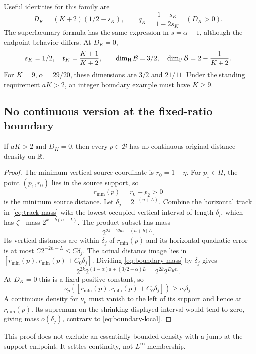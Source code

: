 Useful identities for this family are
\begin{equation}\label{eq:dimension-identities}
 D_K=(K+2)(1/2-s_K),\qquad
 q_K=\frac{1-s_K}{1-2s_K}\quad(D_K>0).
\end{equation}
The superlacunary formula has the same expression in $s=\alpha-1$,
although the endpoint behavior differs.
At $D_K=0$,
\begin{equation}\label{eq:boundary-dimensions}
 s_K=1/2,\quad t_K=\frac{K+1}{K+2},\qquad
 \dim_{\mathrm H}\mathcal B=3/2,\quad\dim_{\mathrm P}\mathcal B=2-\frac1{K+2}.
\end{equation}
For $K=9$, $\alpha=29/20$, these dimensions are $3/2$ and $21/11$.
Under the standing requirement $aK>2$, an integer boundary example must
have $K\geq9$.

\subsection{No continuous version at the fixed-ratio boundary}
\begin{proposition}\label{prop:boundary-discontinuity}
If $aK>2$ and $D_K=0$, then every $p\in\mathcal B$ has no continuous
original distance density on $\mathbb R$.
\end{proposition}
\begin{proof}
The minimum vertical source coordinate is $r_0=1-\eta$. For
$p_1\in H$, the point $(p_1,r_0)$ lies in the source support, so
\[
 r_{\min}(p)=r_0-p_2>0
\]
is the minimum source distance. Let $\delta_j=2^{-(n+L)}$.
Combine the horizontal track in~\eqref{eq:track-mass} with the lowest
occupied vertical interval of length $\delta_j$, which has
$\zeta_+$-mass $2^{k-b(n+L)}$. The product subset has mass
\begin{equation}\label{eq:boundary-mass}
 2^{2k-2bn-(a+b)L}.
\end{equation}
Its vertical distances are within $\delta_j$ of $r_{\min}(p)$ and its
horizontal quadratic error is at most $C2^{-2n-L}\leq C\delta_j$.
The actual distance image lies in
$[r_{\min}(p),r_{\min}(p)+C_0\delta_j]$. Dividing
\eqref{eq:boundary-mass} by $\delta_j$ gives
\begin{equation}\label{eq:boundary-ratio}
 2^{2k}2^{(1-\alpha)n+(3/2-\alpha)L}=2^{2k}2^{D_Kn}.
\end{equation}
At $D_K=0$ this is a fixed positive constant, so
\begin{equation}\label{eq:boundary-local}
 \nu_p([r_{\min}(p),r_{\min}(p)+C_0\delta_j])\geq c_0\delta_j.
\end{equation}
A continuous density for $\nu_p$ must vanish to the left of its support
and hence at $r_{\min}(p)$. Its supremum on the shrinking displayed
interval would tend to zero, giving mass $o(\delta_j)$, contrary to
\eqref{eq:boundary-local}.
\end{proof}
This proof does not exclude an essentially bounded density with a jump at
the support endpoint. It settles continuity, not $L^\infty$ membership.

